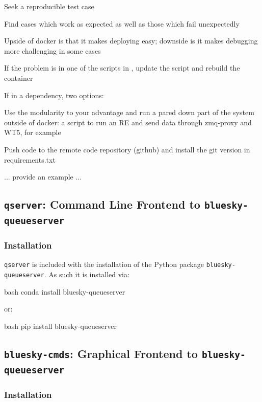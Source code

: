 Seek a reproducible test case

Find cases which work as expected as well as those which fail unexpectedly

Upside of docker is that it makes deploying easy; downside is it makes debugging more challenging in some cases

If the problem is in one of the scripts in \biab, update the script and rebuild the container

If in a dependency, two options:

Use the modularity to your advantage and run a pared down part of the system outside of docker: a script to run an RE and send data through zmq-proxy and WT5, for example

Push code to the remote code repository (github) and install the git version in requirements.txt

... provide an example ...



\subsection{\texttt{qserver}: Command Line Frontend to \texttt{bluesky-queueserver}}

\subsubsection{Installation}

\texttt{qserver} is included with the installation of the Python package \texttt{bluesky-queueserver}.
As such it is installed via:

\begin{codefragment}{bash}
conda install bluesky-queueserver
\end{codefragment}

or:

\begin{codefragment}{bash}
pip install bluesky-queueserver
\end{codefragment}

\subsection{\texttt{bluesky-cmds}: Graphical Frontend to \texttt{bluesky-queueserver}}

\subsubsection{Installation}

